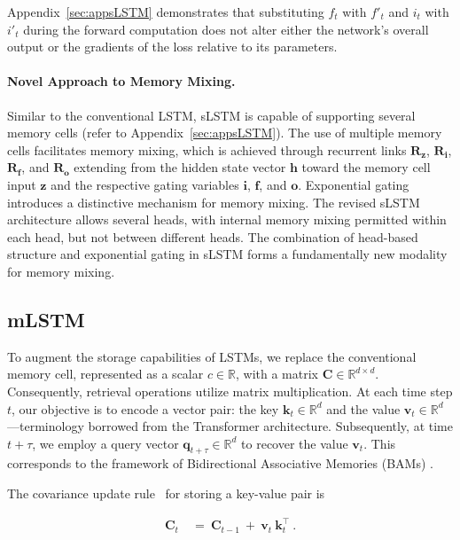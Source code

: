 Appendix~\ref{sec:appsLSTM} demonstrates that substituting $f_t$ with $f'_t$ and $i_t$ with $i'_t$ during the forward computation does not alter either the network's overall output or the gradients of the loss relative to its parameters.

\paragraph{Novel Approach to Memory Mixing.} Similar to the conventional LSTM, sLSTM is capable of supporting several memory cells (refer to Appendix~\ref{sec:appsLSTM}). The use of multiple memory cells facilitates memory mixing, which is achieved through recurrent links $\mathbf{R}_{\mathbf{z}}$, $\mathbf{R}_{\mathbf{i}}$, $\mathbf{R}_{\mathbf{f}}$, and $\mathbf{R}_{\mathbf{o}}$ extending from the hidden state vector $\mathbf{h}$ toward the memory cell input $\mathbf{z}$ and the respective gating variables $\mathbf{i}$, $\mathbf{f}$, and $\mathbf{o}$. Exponential gating introduces a distinctive mechanism for memory mixing. The revised sLSTM architecture allows several heads, with internal memory mixing permitted within each head, but not between different heads. The combination of head-based structure and exponential gating in sLSTM forms a fundamentally new modality for memory mixing.

\subsection{mLSTM}
\label{sec:mLSTM}

To augment the storage capabilities of LSTMs, we replace the conventional memory cell, represented as a scalar $c \in \mathbb{R}$, with a matrix $\mathbf{C} \in \mathbb{R}^{d \times d}$. Consequently, retrieval operations utilize matrix multiplication. At each time step $t$, our objective is to encode a vector pair: the key $\mathbf{k}_t \in \mathbb{R}^d$ and the value $\mathbf{v}_t \in \mathbb{R}^d$—terminology borrowed from the Transformer architecture. Subsequently, at time $t + \tau$, we employ a query vector $\mathbf{q}_{t+\tau} \in \mathbb{R}^d$ to recover the value $\mathbf{v}_t$. This corresponds to the framework of Bidirectional Associative Memories (BAMs) \citep{Kohonen:72,Anderson:72,Nakano:72,Anderson:77}.

The covariance update rule~\citep{Sejnowski:77,Dayan:91} for storing a key-value pair is

\begin{align}
\mathbf{C}_t \ &= \ \mathbf{C}_{t-1} \ + \ \mathbf{v}_{t} \ \mathbf{k}_t^\top \ .
\end{align}

